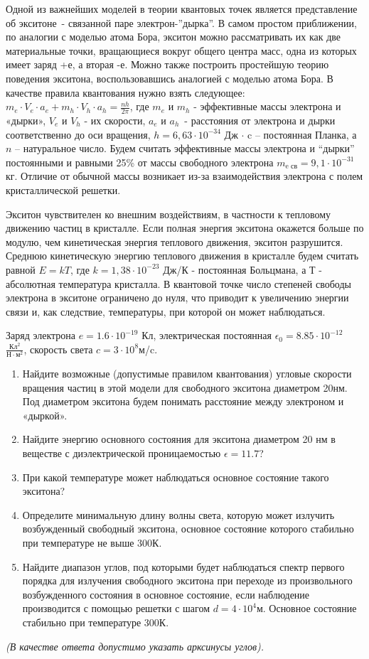 
Одной из важнейших моделей в теории квантовых точек является представление об экситоне~- 
связанной паре электрон-”дырка”. В самом простом приближении, по аналогии с моделью атома Бора, 
экситон можно рассматривать их как две материальные точки, вращающиеся вокруг общего центра масс, 
одна из которых имеет заряд +е, а вторая -е. Можно также построить простейшую теорию поведения экситона, 
воспользовавшись аналогией с моделью атома Бора. В качестве правила квантования нужно взять следующее: 
${m_e \cdot V_e \cdot a_e + m_h \cdot V_h \cdot a_h=\frac{nh}{2 \pi}}$, где $m_e$ и $m_h$  - эффективные массы электрона 
и «дырки», $V_e$ и $V_h$ - их скорости, $a_e$ и $a_h$~- расстояния от электрона и дырки соответственно 
до оси вращения, $h=6,63 \cdot 10^{-34}$  Дж $\cdot$ c – постоянная Планка, а $n$  – натуральное число. 
Будем считать эффективные массы электрона и “дырки” постоянными и равными 25\% от массы свободного электрона 
$m_{\text{e св}}=9,1 \cdot 10^{-31}$кг. Отличие от обычной массы возникает из-за взаимодействия электрона с полем кристаллической решетки.

Экситон чувствителен ко внешним воздействиям, в частности к тепловому движению частиц в кристалле. 
Если полная энергия экситона окажется больше по модулю, чем кинетическая энергия теплового движения, 
экситон разрушится. Среднюю кинетическую энергию теплового движения в кристалле будем считать равной 
$E=kT$, где $k=1,38 \cdot 10^{-23}$ Дж/К  - постоянная Больцмана, а $Т$ - абсолютная температура кристалла. В квантовой точке число степеней 
свободы электрона в экситоне ограничено до нуля, что приводит к увеличению энергии связи и, 
как следствие, температуры, при которой он может наблюдаться. 

Заряд электрона $e=1.6 \cdot 10^{-19}$ Кл, электрическая постоянная $\epsilon_0=8.85 \cdot 10^{-12}$  $\frac{\text{Кл}^2}{\text{Н} \cdot \text{м}^2}$, скорость 
света $c = 3 \cdot 10^8$м/c.

\begin{enumerate}
    \item Найдите возможные (допустимые правилом квантования) угловые скорости вращения частиц в этой 
    модели для свободного экситона диаметром 20нм. Под диаметром экситона будем понимать расстояние 
    между электроном и «дыркой».
    \item Найдите энергию основного состояния для экситона диаметром 20 нм в веществе с диэлектрической проницаемостью $\epsilon=11.7$?
    \item При какой температуре может наблюдаться основное состояние такого экситона?
    \item Определите минимальную длину волны света, которую может излучить возбужденный свободный экситона, основное состояние которого стабильно при температуре не выше 300К.
    \item Найдите диапазон углов, под которыми будет наблюдаться спектр первого порядка для излучения свободного экситона при переходе из произвольного возбужденного состояния в основное состояние, если наблюдение производится с помощью решетки с шагом $d= 4 \cdot 10^4$м. 
    Основное состояние стабильно при температуре 300К.    
\end{enumerate}

\textit{(В качестве ответа допустимо указать арксинусы углов).}